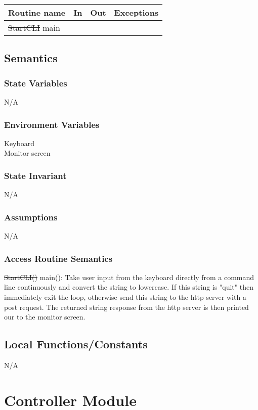 \documentclass[12pt]{article}
\begin{document}
\begin{tabular}{| l | l | l | l |}
\hline
\textbf{Routine name} & \textbf{In} & \textbf{Out} & \textbf{Exceptions}\\
\hline
\sout{StartCLI} {\color{red} main}& & & \\
\hline
\end{tabular}

\subsection {Semantics}

\subsubsection {State Variables}
N/A
\subsubsection {Environment Variables}
Keyboard\\
Monitor screen
\subsubsection {State Invariant}
N/A
\subsubsection {Assumptions}
N/A

\subsubsection{Access Routine Semantics}
\noindent \sout{StartCLI()} {\color{red} main()}: Take user input from the keyboard directly from a command line continuously and convert the string to lowercase. If this string is "quit" then immediately exit the loop, otherwise send this string to the http server with a post request. The returned string response from the http server is then printed our to the monitor screen.\\

\subsection{Local Functions/Constants}
N/A

\newpage

\section {Controller Module}
\end{document}
